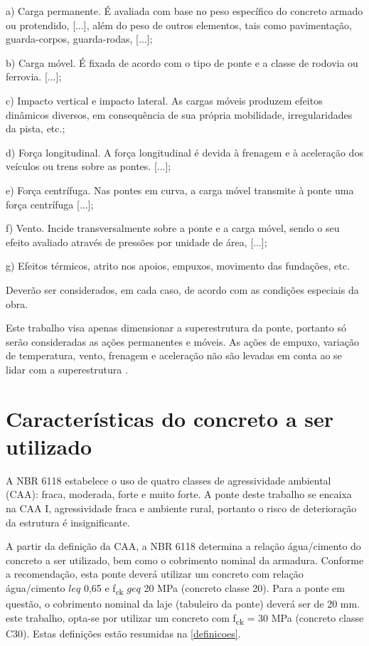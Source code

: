 \begin{citacao}
a) Carga permanente. É avaliada com base no peso específico do concreto armado ou protendido, [...], além do peso de outros elementos, tais como pavimentação, guarda-corpos, guarda-rodas, [...];

b) Carga móvel. É fixada de acordo com o tipo de ponte e a classe de rodovia ou ferrovia. [...];

c) Impacto vertical e impacto lateral. As cargas móveis produzem efeitos dinâmicos diversos, em consequência de sua própria mobilidade, irregularidades da pista, etc.;

d) Força longitudinal. A força longitudinal é devida à frenagem e à aceleração dos veículos ou trens sobre as pontes. [...];

e) Força centrífuga. Nas pontes em curva, a carga móvel transmite à ponte uma força centrífuga [...];

f) Vento. Incide transversalmente sobre a ponte e a carga móvel, sendo o seu efeito avaliado através de pressões por unidade de área, [...];

g) Efeitos térmicos, atrito nos apoios, empuxos, movimento das fundações, etc.

Deverão ser considerados, em cada caso, de acordo com as condições especiais
da obra.
\end{citacao}

Este trabalho visa apenas dimensionar a superestrutura da ponte, portanto só serão consideradas as
ações permanentes e móveis. As ações de empuxo, variação de temperatura, vento, frenagem e aceleração
não são levadas em conta ao se lidar com a superestrutura \cite{Andrade}.

\section{Características do concreto a ser utilizado}


A NBR 6118 \cite[p.~17]{NBR6118:2014} estabelece o uso de quatro classes de agressividade ambiental
(CAA): fraca, moderada, forte e muito forte. A ponte deste trabalho se encaixa na CAA I, agressividade
fraca e ambiente rural, portanto o risco de deterioração da estrutura é insignificante.

A partir da definição da CAA, a NBR 6118 \cite[p.~18-20	]{NBR6118:2014} determina a relação
água/cimento do concreto a ser utilizado, bem como o cobrimento nominal da armadura. Conforme a
recomendação, esta ponte deverá utilizar um concreto com relação água/cimento $ leq $ 0,65 e f\textsubscript{ck} $ geq $ 20 MPa (concreto classe 20). Para a ponte em questão, o cobrimento nominal da laje (tabuleiro da ponte) deverá ser de 20 mm. este trabalho, opta-se por utilizar um concreto com f\textsubscript{ck} = 30 MPa (concreto classe C30). Estas
definições estão resumidas na \autoref{definicoes}.

